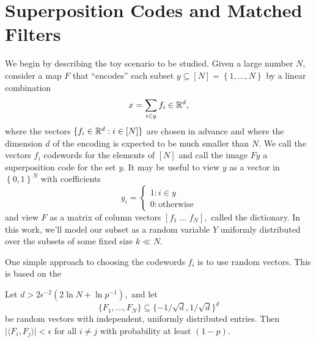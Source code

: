 \section{Superposition Codes and Matched Filters \label{sec:codes}}

We begin by describing the toy scenario to be studied. Given a large number $N,$ consider a map $F$ that ``encodes'' each subset $y \subseteq [N] = \left\{ 1, \dots, N \right\}$ by a linear combination
$$
	x = \sum_{i \in y} f_i \in \mathbb{R}^d,
$$
where the vectors $\{ f_i \in \mathbb{R}^d : i \in [N] \}$ are chosen in advance and where the dimension $d$ of the encoding is expected to be much smaller than $N.$ We call the vectors $f_i$ codewords for the elements of $[N]$ and call the image $Fy$ a superposition code for the set $y.$ It may be useful to view $y$ as a vector in $\left\{ 0, 1 \right\}^N$ with coefficients
$$
	y_i = \begin{cases}
		1: i \in y \\
		0 : \text{otherwise}
	\end{cases}
$$
and view $F$ as a matrix of column vectors $[f_1 \; \dots \; f_N],$ called the dictionary. In this work, we'll model our subset as a random variable $Y$ uniformly distributed over the subsets of some fixed size $k \ll N.$

One simple approach to choosing the codewords $f_i$ is to use random vectors. This is based on the

\begin{proposition}
	\label{prop:many-ortho}
	Let $d > 2 \epsilon^{-2} (2 \ln N + \ln p^{-1}),$ and let
	$$
		\{ F_1, \dots, F_N \} \subseteq \{ - 1/\sqrt d,  1 / \sqrt d \}^d
	$$
	be random vectors with independent, uniformly distributed entries. Then $\lvert \langle F_i, F_j \rangle \rvert < \epsilon$ for all $i \neq j$ with probability at least $(1 - p).$
\end{proposition}


